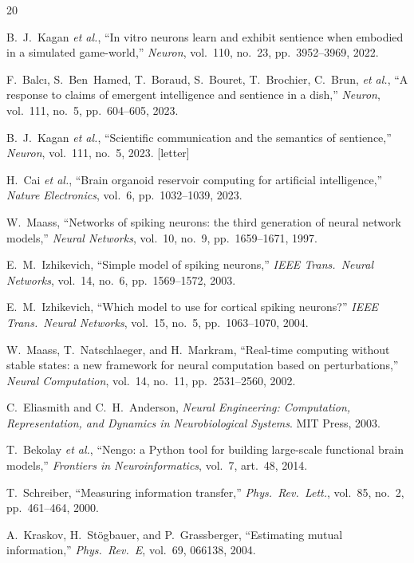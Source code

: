 \begin{thebibliography}{20}

B.~J.~Kagan \emph{et al.}, ``In vitro neurons learn and exhibit sentience when
embodied in a simulated game-world,'' \emph{Neuron}, vol.~110, no.~23,
pp.~3952--3969, 2022.

F.~Balc{\i}, S.~Ben~Hamed, T.~Boraud, S.~Bouret, T.~Brochier, C.~Brun,
\emph{et al.}, ``A response to claims of emergent intelligence and sentience in
a dish,'' \emph{Neuron}, vol.~111, no.~5, pp.~604--605, 2023.

B.~J.~Kagan \emph{et al.}, ``Scientific communication and the semantics of
sentience,'' \emph{Neuron}, vol.~111, no.~5, 2023. [letter]

H.~Cai \emph{et al.}, ``Brain organoid reservoir computing for artificial
intelligence,'' \emph{Nature Electronics}, vol.~6, pp.~1032--1039, 2023.

W.~Maass, ``Networks of spiking neurons: the third generation of neural network
models,'' \emph{Neural Networks}, vol.~10, no.~9, pp.~1659--1671, 1997.

E.~M.~Izhikevich, ``Simple model of spiking neurons,'' \emph{IEEE Trans.\
Neural Networks}, vol.~14, no.~6, pp.~1569--1572, 2003.

E.~M.~Izhikevich, ``Which model to use for cortical spiking neurons?''
\emph{IEEE Trans.\ Neural Networks}, vol.~15, no.~5, pp.~1063--1070, 2004.

W.~Maass, T.~Natschlaeger, and H.~Markram, ``Real-time computing without stable
states: a new framework for neural computation based on perturbations,''
\emph{Neural Computation}, vol.~14, no.~11, pp.~2531--2560, 2002.

C.~Eliasmith and C.~H.~Anderson, \emph{Neural Engineering: Computation,
Representation, and Dynamics in Neurobiological Systems}. MIT Press, 2003.

T.~Bekolay \emph{et al.}, ``Nengo: a Python tool for building large-scale
functional brain models,'' \emph{Frontiers in Neuroinformatics}, vol.~7,
art.~48, 2014.

T.~Schreiber, ``Measuring information transfer,'' \emph{Phys.\ Rev.\ Lett.},
vol.~85, no.~2, pp.~461--464, 2000.

A.~Kraskov, H.~St{\"o}gbauer, and P.~Grassberger, ``Estimating mutual
information,'' \emph{Phys.\ Rev.\ E}, vol.~69, 066138, 2004.


\end{thebibliography}
